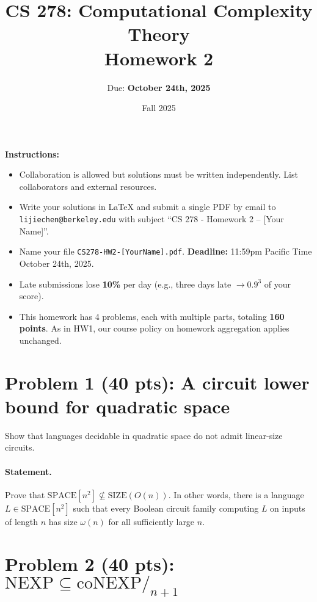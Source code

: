 \documentclass[12pt]{article}
\title{CS 278: Computational Complexity Theory\\
       Homework 2}
\author{Due: \textbf{October 24th, 2025}}
\date{Fall 2025}
\newcommand{\SPACE}{\text{SPACE}}
\newcommand{\SIZE}{\text{SIZE}}
\newcommand{\NEXP}{\text{NEXP}}
\newcommand{\coNEXP}{\text{coNEXP}}
\begin{document}
\maketitle

\begin{center}
\textbf{Instructions:}

\begin{itemize}
    \item Collaboration is allowed but solutions must be written independently. List collaborators and external resources.
    \item Write your solutions in \LaTeX\xspace and submit a single PDF by email to \texttt{lijiechen@berkeley.edu} with subject ``CS 278 - Homework 2 -- [Your Name]''.
    \item Name your file \texttt{CS278-HW2-[YourName].pdf}. \textbf{Deadline:} 11:59pm Pacific Time October 24th, 2025.
    \item Late submissions lose \textbf{10\%} per day (e.g., three days late $\rightarrow 0.9^3$ of your score).
    \item This homework has 4 problems, each with multiple parts, totaling \textbf{160 points}. As in HW1, our course policy on homework aggregation applies unchanged.
\end{itemize}
\end{center}

\vspace{0.5cm}

\newpage

\section{Problem 1 (40 pts): A circuit lower bound for quadratic space}

Show that languages decidable in quadratic space do not admit linear-size circuits.

\paragraph{Statement.}
Prove that $\SPACE[n^2] \not\subseteq \SIZE(O(n))$. In other words, there is a language $L \in \SPACE[n^2]$ such that every Boolean circuit family computing $L$ on inputs of length $n$ has size $\omega(n)$ for all sufficiently large $n$.

\newpage

\section{Problem 2 (40 pts): \texorpdfstring{$\NEXP \subseteq \coNEXP/_{n+1}$}{NEXP ⊆ coNEXP/{n+1}}}
\end{document}
